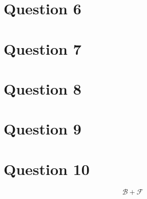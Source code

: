 \documentclass{article}
\begin{document}
\section*{Question 6}{

}

\section*{Question 7}{

}

\section*{Question 8}{

}

\section*{Question 9}{

}

\section*{Question 10}{
    \[\mathcal{B}+\mathcal{F}\]
}
\end{document}

